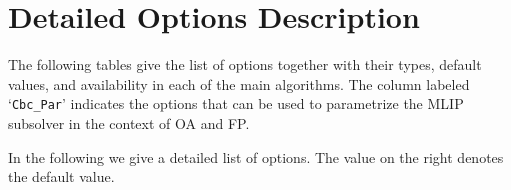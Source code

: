 \section{Detailed Options Description}
\label{sub:bonminalloptions}

The following tables give the list of options together with their types, default values, and availability in each of the main algorithms.
The column labeled `\texttt{Cbc\_Par}' indicates the options that can be used to parametrize the MLIP subsolver in the context of OA and FP.



In the following we give a detailed list of \BONMIN options.
The value on the right denotes the default value.



%


\chapterend
